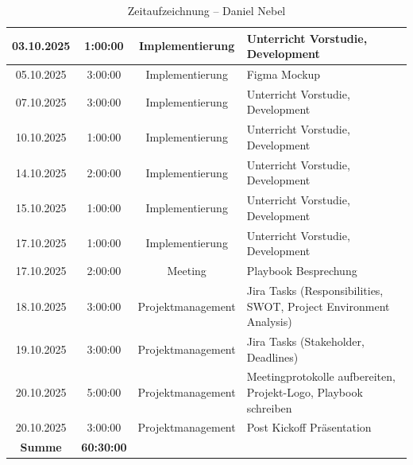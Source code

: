 \documentclass{article}
\begin{document}
\begin{table}[H]
\begin{tabularx}{\textwidth}{|c|c|c|X|}
    03.10.2025 & 1:00:00 & Implementierung   & Unterricht Vorstudie, Development \\ \hline
    05.10.2025 & 3:00:00 & Implementierung   & Figma Mockup \\ \hline
    07.10.2025 & 3:00:00 & Implementierung   & Unterricht Vorstudie, Development \\ \hline
    10.10.2025 & 1:00:00 & Implementierung   & Unterricht Vorstudie, Development \\ \hline
    14.10.2025 & 2:00:00 & Implementierung   & Unterricht Vorstudie, Development \\ \hline
    15.10.2025 & 1:00:00 & Implementierung   & Unterricht Vorstudie, Development \\ \hline
    17.10.2025 & 1:00:00 & Implementierung   & Unterricht Vorstudie, Development \\ \hline
    17.10.2025 & 2:00:00 & Meeting           & Playbook Besprechung \\ \hline
    18.10.2025 & 3:00:00 & Projektmanagement & Jira Tasks (Responsibilities, SWOT, Project Environment Analysis) \\ \hline
    19.10.2025 & 3:00:00 & Projektmanagement & Jira Tasks (Stakeholder, Deadlines) \\ \hline
    20.10.2025 & 5:00:00 & Projektmanagement & Meetingprotokolle aufbereiten, Projekt-Logo, Playbook schreiben \\ \hline
    20.10.2025 & 3:00:00 & Projektmanagement & Post Kickoff Präsentation \\ \hline
    \rowcolor{black!10}\textbf{Summe} & \textbf{60:30:00} & & \\ \hline
  \end{tabularx}
  \caption{Zeitaufzeichnung – Daniel Nebel}
  \label{tab:zeit-daniel}
\end{table}
\end{document}
